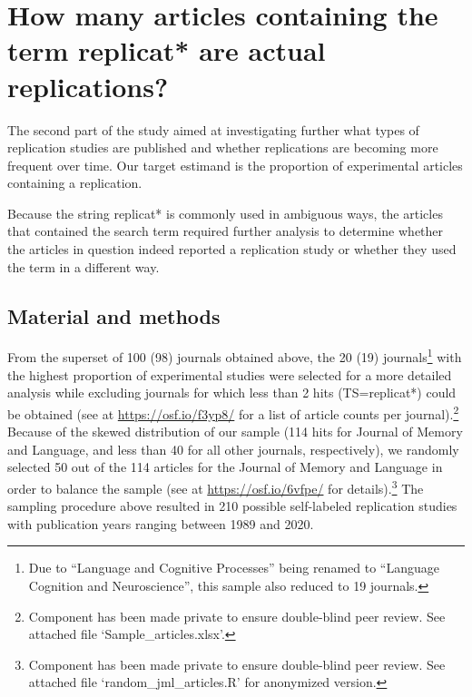 \documentclass[cm,linguex]{glossa}
\begin{document}
\hypertarget{how-many-articles-containing-the-term-replicat-are-actual-replications}{%
\section{How many articles containing the term replicat* are actual replications?}\label{how-many-articles-containing-the-term-replicat-are-actual-replications}}

The second part of the study aimed at investigating further what types of replication studies are published and whether replications are becoming more frequent over time. Our target estimand is the proportion of experimental articles containing a replication.

Because the string replicat* is commonly used in ambiguous ways, the articles that contained the search term required further analysis to determine whether the articles in question indeed reported a replication study or whether they used the term in a different way.

\hypertarget{material-and-methods-1}{%
\subsection{Material and methods}\label{material-and-methods-1}}

From the superset of 100 (98) journals obtained above, the 20 (19) journals\footnote{Due to ``Language and Cognitive Processes'' being renamed to ``Language Cognition and Neuroscience'', this sample also reduced to 19 journals.} with the highest proportion of experimental studies were selected for a more detailed analysis while excluding journals for which less than 2 hits (TS=replicat*) could be obtained (see at \url{https://osf.io/f3yp8/} for a list of article counts per journal).\footnote{Component has been made private to ensure double-blind peer review. See attached file `Sample\_articles.xlsx'.}
Because of the skewed distribution of our sample (114 hits for Journal of Memory and Language, and less than 40 for all other journals, respectively), we randomly selected 50 out of the 114 articles for the Journal of Memory and Language in order to balance the sample (see at \url{https://osf.io/6vfpe/} for details).\footnote{Component has been made private to ensure double-blind peer review. See attached file `random\_jml\_articles.R' for anonymized version.}
The sampling procedure above resulted in 210 possible self-labeled replication studies with publication years ranging between 1989 and 2020.
\end{document}
